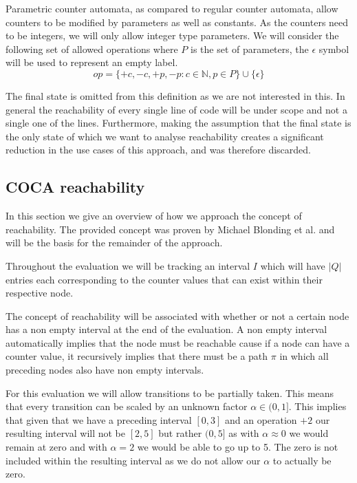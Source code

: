 \documentclass[12pt]{article}
\begin{document}
Parametric counter automata, as compared to regular counter automata, allow counters to be modified by parameters as well as constants. As the counters need to be integers, we will only allow integer type parameters. We will consider the following set of allowed operations where $P$ is the set of parameters, the $\epsilon$ symbol will be used to represent an empty label.
\[
op = \{+c, -c, +p, -p: c \in \mathbb{N}, p \in P\} \cup \{\epsilon\}
\]

The final state is omitted from this definition as we are not interested in this. In general the reachability of every single line of code will be under scope and not a single one of the lines. Furthermore, making the assumption that the final state is the only state of which we want to analyse reachability creates a significant reduction in the use cases of this approach, and was therefore discarded.

\subsection{COCA reachability}
In this section we give an overview of how we approach the concept of reachability. The provided concept was proven by Michael Blonding et al. \cite{blondin2021continuous} and will be the basis for the remainder of the approach.

Throughout the evaluation we will be tracking an interval $I$ which will have $\vert Q \vert$ entries each corresponding to the counter values that can exist within their respective node. 

The concept of reachability will be associated with whether or not a certain node has a non empty interval at the end of the evaluation. A non empty interval automatically implies that the node must be reachable cause if a node can have a counter value, it recursively implies that there must be a path $\pi$ in which all preceding nodes also have non empty intervals.

For this evaluation we will allow transitions to be partially taken. This means that every transition can be scaled by an unknown factor $\alpha \in (0,1]$. This implies that given that we have a preceding interval $[0, 3]$ and an operation $+2$ our resulting interval will not be $[2, 5]$ but rather $(0, 5]$ as with $\alpha \approx 0$ we would remain at zero and with $\alpha = 2$ we would be able to go up to 5. The zero is not included within the resulting interval as we do not allow our $\alpha$ to actually be zero.
\end{document}
